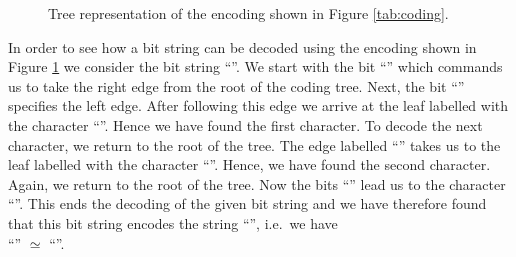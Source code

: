 \begin{figure}[!ht]
  \centering
  \caption{Tree representation of the encoding shown in Figure \ref{tab:coding}.}
  \label{fig:coding-tree}
\end{figure}
In order to see how a bit string can be decoded using the encoding shown in Figure \ref{fig:coding-tree}
we consider the bit string ``''.  We start with the bit ``'' which commands us to take
the right edge from the root of the coding tree.  Next, the bit ``'' specifies the left edge.  
After following this edge we arrive at the leaf labelled with the character ``''.  Hence we have
found the first character.  To decode the next character, we return to the root of the tree.  The edge labelled
``'' takes us to the leaf labelled with the character ``''.  Hence, we have found the
second character.  Again, we return to the root of the tree.  Now the bits ``'' lead us to the
character ``''.  This ends the decoding of the given bit string and we have therefore found that this
bit string encodes the string ``'', i.e.~we have
\\[0.2cm]
\hspace*{1.3cm}
``'' $\simeq$ ``''.


